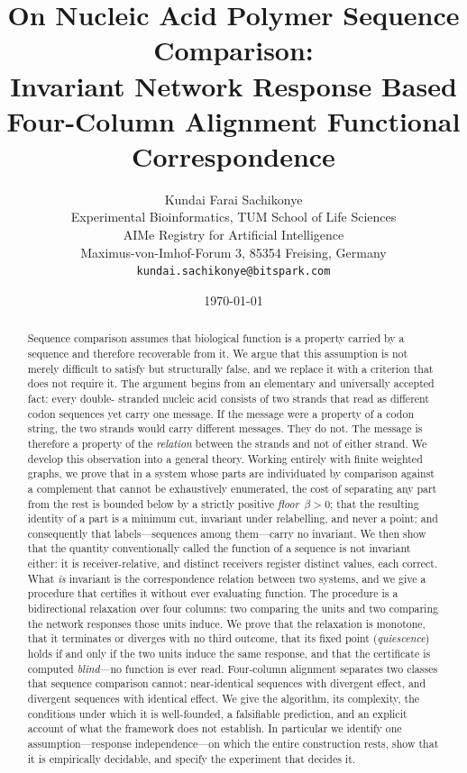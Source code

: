 \documentclass[11pt,twocolumn,a4paper]{article}
\title{\textbf{On Nucleic Acid Polymer Sequence Comparison: \\ Invariant Network Response Based Four-Column Alignment Functional Correspondence 
}}
\author{%
Kundai Farai Sachikonye\\[0.3em]
\normalsize Experimental Bioinformatics, TUM School of Life Sciences\\
\normalsize AIMe Registry for Artificial Intelligence \\
\normalsize Maximus-von-Imhof-Forum 3, 85354 Freising, Germany\\
\normalsize \texttt{kundai.sachikonye@bitspark.com}}
\date{\today}
\theoremstyle{definition}
\theoremstyle{remark}
\newcommand{\flo}{\beta}
\begin{document}
\maketitle

\begin{abstract}
\noindent
Sequence comparison assumes that biological function is a property carried
by a sequence and therefore recoverable from it. We argue that this
assumption is not merely difficult to satisfy but structurally false, and
we replace it with a criterion that does not require it. The argument
begins from an elementary and universally accepted fact: every double-%
stranded nucleic acid consists of two strands that read as different codon
sequences yet carry one message. If the message were a property of a
codon string, the two strands would carry different messages. They do not.
The message is therefore a property of the \emph{relation} between the
strands and not of either strand. We develop this observation into a
general theory. Working entirely with finite weighted graphs, we prove
that in a system whose parts are individuated by comparison against a
complement that cannot be exhaustively enumerated, the cost of separating
any part from the rest is bounded below by a strictly positive
\emph{floor}~$\flo>0$; that the resulting identity of a part is a minimum
cut, invariant under relabelling, and never a point; and consequently that
labels---sequences among them---carry no invariant. We then show that the
quantity conventionally called the function of a sequence is not invariant
either: it is receiver-relative, and distinct receivers register distinct
values, each correct. What \emph{is} invariant is the correspondence
relation between two systems, and we give a procedure that certifies it
without ever evaluating function. The procedure is a bidirectional
relaxation over four columns: two comparing the units and two comparing
the network responses those units induce. We prove that the relaxation is
monotone, that it terminates or diverges with no third outcome, that its
fixed point (\emph{quiescence}) holds if and only if the two units induce
the same response, and that the certificate is computed \emph{blind}---no
function is ever read. Four-column alignment separates two classes that
sequence comparison cannot: near-identical sequences with divergent effect,
and divergent sequences with identical effect. We give the algorithm, its
complexity, the conditions under which it is well-founded, a falsifiable
prediction, and an explicit account of what the framework does not
establish. In particular we identify one assumption---response
independence---on which the entire construction rests, show that it is
empirically decidable, and specify the experiment that decides it.
\end{abstract}
\end{document}
